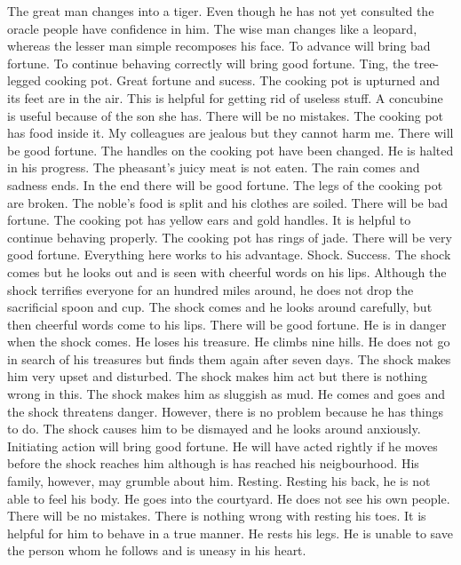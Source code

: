 	{The great man changes into a tiger. Even though he has not yet consulted the oracle people have
		confidence in him.}
	{The wise man changes like a leopard, whereas the lesser man simple recomposes his face. To advance
		will bring bad fortune. To continue behaving correctly will bring good fortune.}
\or {}
	{Ting, the tree-legged cooking pot. Great fortune and sucess.}
	{The cooking pot is upturned and its feet are in the air. This is helpful for getting rid of useless
		stuff. A concubine is useful because of the son she has. There will be no mistakes.}
	{The cooking pot has food inside it. My colleagues are jealous but they cannot harm me. There will be
		good fortune.}
	{The handles on the cooking pot have been changed. He is halted in his progress. The pheasant's juicy
		meat is not eaten. The rain comes and sadness ends. In the end there will be good fortune.}
	{The legs of the cooking pot are broken. The noble's food is split and his clothes are soiled.
		There will be bad fortune.}
	{The cooking pot has yellow ears and gold handles. It is helpful to continue behaving properly.}
	{The cooking pot has rings of jade. There will be very good fortune. Everything here works to his advantage.}
\or {}
	{Shock. Success. The shock comes but he looks out and is seen with cheerful words on his lips. Although
		the shock terrifies everyone for an hundred miles around, he does not drop the sacrificial
		spoon and cup.}
	{The shock comes and he looks around carefully, but then cheerful words come to his lips. There will be
		good fortune.}
	{He is in danger when the shock comes. He loses his treasure. He climbs nine hills. He does not go in search
	of his treasures but finds them again after seven days.}
	{The shock makes him very upset and disturbed. The shock makes him act but there is nothing wrong in this.}
	{The shock makes him as sluggish as mud.}
	{He comes and goes and the shock threatens danger. However, there is no problem because he has things to do.}
	{The shock causes him to be dismayed and he looks around anxiously. Initiating action will bring good
	fortune. He will have acted rightly if he moves before the shock reaches him although is has reached his
	neigbourhood. His family, however, may grumble about him.}
\or {}
	{Resting. Resting his back, he is not able to feel his body. He goes into the courtyard. He does not
	see his own people. There will be no mistakes.}
	{There is nothing wrong with resting his toes. It is helpful for him to behave in a true manner.}
	{He rests his legs. He is unable to save the person whom he follows and is uneasy in his heart.}
